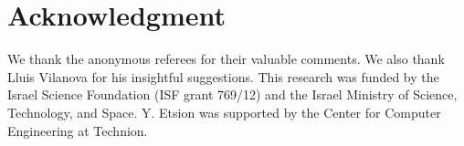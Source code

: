 \section*{Acknowledgment}
\label{sec:acks}

We thank the anonymous referees for their valuable comments.
We also thank Lluis Vilanova for his insightful suggestions.
This research was funded by the Israel Science Foundation (ISF grant 769/12) and the Israel Ministry of Science, Technology, and Space. Y. Etsion was supported by the Center for Computer Engineering at Technion.
